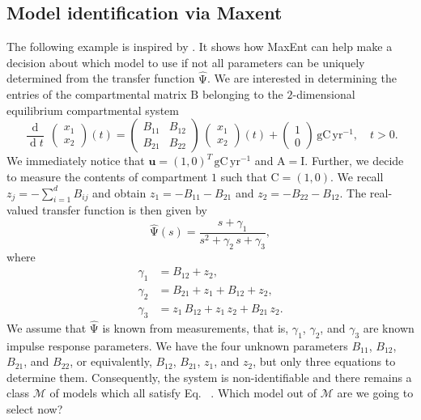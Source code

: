 \documentclass[smallextended]{svjour3}
\makeatletter
\renewcommand*{\eqref}[1]{%
  \hyperref[{#1}]{\textup{\tagform@{\ref*{#1}}}}%
}
\renewcommand{\tens}[1]{\mathrm{#1}}
\renewcommand{\vec}[1]{\mathbf{#1}}
\newcommand{\deriv}[1]{\frac{\operatorname{d}}{\operatorname{d}#1}}
\newcommand{\gC}{\mathrm{gC}}
\newcommand{\yr}{\mathrm{yr}}
\newcommand{\ie}{that is}
\makeatother
\begin{document}
\subsection{Model identification via Maxent}
  \label{sec:model_identification}
  The following example is inspired by \citet[Example~16\,C]{Anderson1983}.
  It shows how MaxEnt can help make a decision about which model to use if not all parameters can be uniquely determined from the transfer function $\widehat{\tens{\Psi}}$.
	We are interested in determining the entries of the compartmental matrix $\tens{B}$ belonging to the $2$-dimensional equilibrium compartmental system
	\begin{equation}\label{eqn:opt_example}
        \deriv{t}\,
		\begin{pmatrix} x_1 \\ x_2 \end{pmatrix}(t)
		=
		\begin{pmatrix} B_{11} & B_{12} \\ B_{21} & B_{22} \end{pmatrix}\,
		\begin{pmatrix} x_1 \\ x_2 \end{pmatrix}(t)
		+
		\begin{pmatrix} 1 \\ 0 \end{pmatrix}\,\gC\,\yr^{-1},
		\quad t>0.
	\end{equation}
	We immediately notice that $\vec{u}=(1,0)^T\,\gC\,\yr^{-1}$ and $\tens{A}=\tens{I}$.
	Further, we decide to measure the contents of compartment $1$ such that $\tens{C} = (1,0)$.
	We recall $z_j = -\sum_{i=1}^d B_{ij}$ and obtain $z_1 = -B_{11} - B_{21}$ and $z_2 = - B_{22} - B_{12}$.
	The real-valued transfer function is then given by
	\begin{equation}
		\widehat{\tens{\Psi}}(s) = \frac{s + \gamma_1}{s^2+\gamma_2\,s+\gamma_3},
	\end{equation}
	where
	\begin{equation}\label{eqn:measurement_data}
		\begin{aligned}
			\gamma_1 &= B_{12} + z_2,\\
			\gamma_2 &= B_{21} + z_1 + B_{12} + z_2,\\
			\gamma_3 &= z_1\,B_{12} + z_1\,z_2 + B_{21}\,z_2.
		\end{aligned}
	\end{equation}
	We assume that $\widehat{\tens{\Psi}}$ is known from measurements, \ie, $\gamma_1$, $\gamma_2$, and $\gamma_3$ are known impulse response parameters.	
	We have the four unknown parameters $B_{11}$, $B_{12}$, $B_{21}$, and $B_{22}$, or equivalently, $B_{12}$, $B_{21}$, $z_1$, and $z_2$, but only three equations to determine them.
	Consequently, the system is non-identifiable and there remains a class $\mathcal{M}$ of models which all satisfy Eq.~\eqref{eqn:measurement_data}.
	Which model out of $\mathcal{M}$ are we going to select now?
\end{document}

